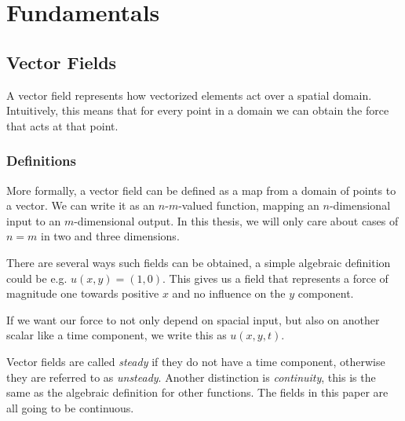 \chapter{Fundamentals}
\section{Vector Fields}
A vector field represents how vectorized elements act over a spatial domain.
Intuitively, this means that for every point in a domain we can obtain the force that acts at that point.

\subsection{Definitions}
More formally, a vector field can be defined as a map from a domain of points to a vector.
We can write it as an $n$-$m$-valued function, mapping an $n$-dimensional input to an $m$-dimensional output.
In this thesis, we will only care about cases of $n=m$ in two and three dimensions.

There are several ways such fields can be obtained, a simple algebraic definition could be e.g. $u(x,y) = (1,0)$.
This gives us a field that represents a force of magnitude one towards positive $x$ and no influence on the $y$ component.

If we want our force to not only depend on spacial input, but also on another scalar like a time component, we write this as $u(x,y,t)$.

Vector fields are called \textit{steady} if they do not have a time component, otherwise they are referred to as \textit{unsteady}.
Another distinction is \textit{continuity}, this is the same as the algebraic definition for other functions.
The fields in this paper are all going to be continuous.


